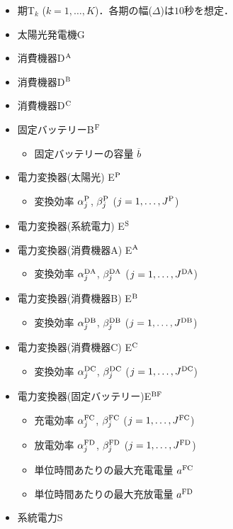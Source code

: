\documentclass{jarticle}
\newcommand{\IB}{$\bullet$}
\newcommand{\IS}{$*$}
\begin{document}
\begin{itemize}
 \item[\IS] 期T$_k$ ($k=1,\ldots,K$)．各期の幅($\Delta$)は$10$秒を想定．
 \item[\IS] 太陽光発電機G
 \item[\IS] 消費機器D$^{\rm A}$
 \item[\IS] 消費機器D$^{\rm B}$
 \item[\IS] 消費機器D$^{\rm C}$
 \item[\IS] 固定バッテリーB$^{\rm F}$
  \begin{itemize}
   \item[\IB] 固定バッテリーの容量 $\overline{b}$
  \end{itemize}
 \item[\IS] 電力変換器(太陽光) E$^{\rm P}$
  \begin{itemize}
   \item[\IB] 変換効率 $\alpha^{\rm P}_{j}$, $\beta^{\rm P}_j$
              ($j=1,\ldots,J^{\rm P}$)
  \end{itemize}
 \item[\IS] 電力変換器(系統電力) E$^{\rm S}$
 \item[\IS] 電力変換器(消費機器A) E$^{\rm A}$
  \begin{itemize}
   \item[\IB] 変換効率 $\alpha^{\rm DA}_{j}$, $\beta^{\rm DA}_j$
              ($j=1,\ldots,J^{\rm DA}$)
  \end{itemize}
 \item[\IS] 電力変換器(消費機器B) E$^{\rm B}$
  \begin{itemize}
   \item[\IB] 変換効率 $\alpha^{\rm DB}_{j}$, $\beta^{\rm DB}_j$
              ($j=1,\ldots,J^{\rm DB}$)
  \end{itemize}
 \item[\IS] 電力変換器(消費機器C) E$^{\rm C}$
  \begin{itemize}
   \item[\IB] 変換効率 $\alpha^{\rm DC}_{j}$, $\beta^{\rm DC}_j$
              ($j=1,\ldots,J^{\rm DC}$)
  \end{itemize}
 \item[\IS] 電力変換器(固定バッテリー)E$^{\rm BF}$
  \begin{itemize}
   \item[\IB] 充電効率 $\alpha^{\rm FC}_{j}$, $\beta^{\rm FC}_j$
              ($j=1,\ldots,J^{\rm FC}$)
   \item[\IB] 放電効率 $\alpha^{\rm FD}_{j}$, $\beta^{\rm FD}_j$
              ($j=1,\ldots,J^{\rm FD}$)
   \item[\IB] 単位時間あたりの最大充電電量 $a^{\rm FC}$
   \item[\IB] 単位時間あたりの最大充放電量 $a^{\rm FD}$
  \end{itemize}
 \item[\IS] 系統電力S
\end{itemize}
\end{document}
